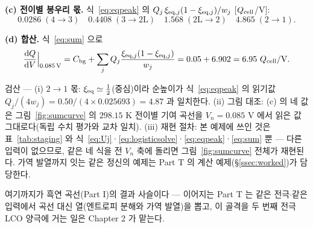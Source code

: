 \textbf{(c) 전이별 봉우리 몫.} 식~\eqref{eq:eqpeak} 의 $Q_j\,\xi_{\mathrm{eq},j}(1-\xi_{\mathrm{eq},j})/w_j$ [$Q_{\mathrm{cell}}$/V]:
\[
0.0286\;(4\!\to\!3)\quad 0.4408\;(3\!\to\!2\mathrm L)\quad 1.568\;(2\mathrm L\!\to\!2)\quad 4.865\;(2\!\to\!1).
\]

\textbf{(d) 합산.} 식~\eqref{eq:sum} 으로
\[
\frac{\mathrm{d} Q}{\mathrm{d} V}\Big|_{0.085\,\mathrm V}=C_{\mathrm{bg}}+\sum_j Q_j\frac{\xi_{\mathrm{eq},j}(1-\xi_{\mathrm{eq},j})}{w_j}
=0.05+6.902=6.95\ Q_{\mathrm{cell}}/\mathrm{V}.
\]
\begin{verifybox}
검산 --- (i) $2\!\to\!1$ 몫: $\xi_{\mathrm{eq}}\simeq\tfrac12$(중심)이라 순높이가 식~\eqref{eq:eqpeak} 의 읽기값
$Q_j/(4w_j)=0.50/(4\times0.025693)=4.87$ 과 일치한다. (ii) 그림 대조: (c) 의 네 값은
그림~\ref{fig:sumcurve} 의 $298.15$ K 전이별 기여 곡선을 $V_n=0.085$ V 에서 읽은 값 그대로다(독립
수치 평가와 교차 일치). (iii) 재현 절차: 본 예제에 쓰인 것은 표~\ref{tab:staging} 와
식~\eqref{eq:Uj}·\eqref{eq:logisticsolve}·\eqref{eq:eqpeak}·\eqref{eq:sum} 뿐 --- 다른 입력이 없으므로,
같은 네 식을 전 $V_n$ 축에 돌리면 그림~\ref{fig:sumcurve} 전체가 재현된다. 가역 발열까지 잇는 같은
정신의 예제는 Part T 의 계산 예제(\S\ref{ssec:worked})가 담당한다.
\end{verifybox}


여기까지가 흑연 곡선(Part I)의 결과 사슬이다 --- 이어지는 Part T 는 같은 전극$\cdot$같은 입력에서 곡선
대신 열(엔트로피 분해와 가역 발열)을 뽑고, 이 골격을 두 번째 전극 LCO 양극에 거는 일은 Chapter 2 가 맡는다.

